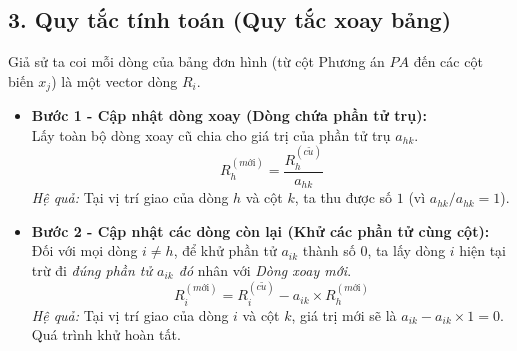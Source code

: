 \subsection*{3. Quy tắc tính toán (Quy tắc xoay bảng)}
Giả sử ta coi mỗi dòng của bảng đơn hình (từ cột Phương án $PA$ đến các cột biến $x_j$) là một vector dòng $R_i$.
\begin{itemize}
    \item \textbf{Bước 1 - Cập nhật dòng xoay (Dòng chứa phần tử trụ):} \\
    Lấy toàn bộ dòng xoay cũ chia cho giá trị của phần tử trụ $a_{hk}$.
    \begin{equation}
        R_h^{(m\text{ới})} = \frac{R_h^{(c\tilde{u})}}{a_{hk}}
    \end{equation}
    \textit{Hệ quả:} Tại vị trí giao của dòng $h$ và cột $k$, ta thu được số $1$ (vì $a_{hk}/a_{hk} = 1$).
    
    \item \textbf{Bước 2 - Cập nhật các dòng còn lại (Khử các phần tử cùng cột):} \\
    Đối với mọi dòng $i \neq h$, để khử phần tử $a_{ik}$ thành số $0$, ta lấy dòng $i$ hiện tại trừ đi \textit{đúng phần tử $a_{ik}$ đó} nhân với \textit{Dòng xoay mới}.
    \begin{equation}
        R_i^{(m\text{ới})} = R_i^{(c\tilde{u})} - a_{ik} \times R_h^{(m\text{ới})}
    \end{equation}
    \textit{Hệ quả:} Tại vị trí giao của dòng $i$ và cột $k$, giá trị mới sẽ là $a_{ik} - a_{ik} \times 1 = 0$. Quá trình khử hoàn tất.
\end{itemize}